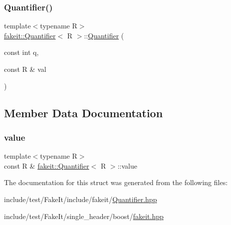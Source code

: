 \mbox{\label{structfakeit_1_1Quantifier_a9eb6f158c8d585a00e03d1fdcde24af3}} 
\subsubsection{\texorpdfstring{Quantifier()}{Quantifier()}\hspace{0.1cm}{\footnotesize\ttfamily [9/9]}}
{\footnotesize\ttfamily template$<$typename R$>$ \\
\mbox{\hyperlink{structfakeit_1_1Quantifier}{fakeit\+::\+Quantifier}}$<$ R $>$\+::\mbox{\hyperlink{structfakeit_1_1Quantifier}{Quantifier}} (\begin{DoxyParamCaption}\item[{const int}]{q,  }\item[{const R \&}]{val }\end{DoxyParamCaption})\hspace{0.3cm}{\ttfamily [inline]}}



\subsection{Member Data Documentation}
\mbox{\label{structfakeit_1_1Quantifier_a90fd98e4a05be4480d51fcfc33307cee}} 
\subsubsection{\texorpdfstring{value}{value}}
{\footnotesize\ttfamily template$<$typename R$>$ \\
const R \& \mbox{\hyperlink{structfakeit_1_1Quantifier}{fakeit\+::\+Quantifier}}$<$ R $>$\+::value}



The documentation for this struct was generated from the following files\+:\begin{DoxyCompactItemize}
\item 
include/test/\+Fake\+It/include/fakeit/\mbox{\hyperlink{Quantifier_8hpp}{Quantifier.\+hpp}}\item 
include/test/\+Fake\+It/single\+\_\+header/boost/\mbox{\hyperlink{single__header_2boost_2fakeit_8hpp}{fakeit.\+hpp}}\end{DoxyCompactItemize}
